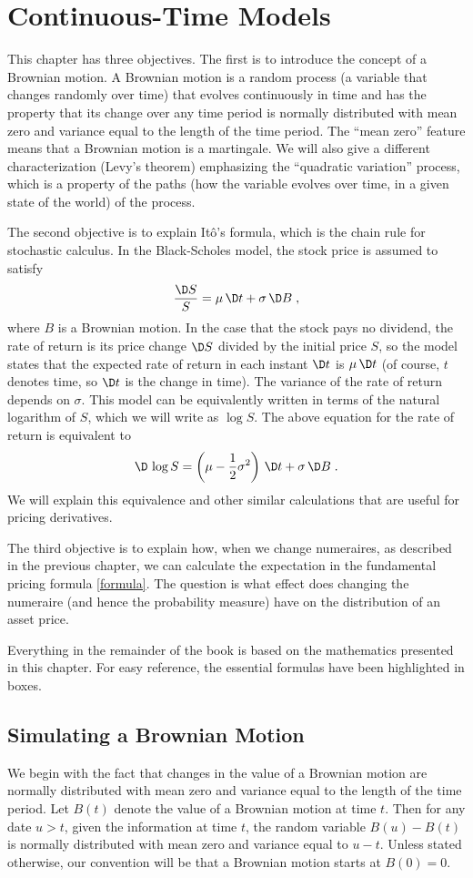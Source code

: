 \chapter{Continuous-Time Models}\label{c_continuoustime}

This chapter has three objectives.  The first is to introduce the concept of a Brownian motion.  A Brownian motion is a random process (a variable that changes randomly over time) that evolves continuously in time and has the property that its change over any time period is normally distributed with mean zero and variance equal to the length of the time period.  The ``mean zero'' feature means that a Brownian motion is a martingale.  We will also give a different characterization (Levy's theorem) emphasizing the ``quadratic variation'' process, which is a property of the paths (how the variable evolves over time, in a given state of the world) of the process.  

The second objective is to explain It\^o's formula, which is the chain rule for stochastic calculus.  In the Black-Scholes model, the stock price is assumed to satisfy
$$\frac{\D S}{S}=\mu\,\D t+\sigma\,\D B\; ,$$
where $B$ is a Brownian motion.  In the case that the stock pays no dividend, the rate of return is its price change $\D S$ divided by the initial price $S$, so the model states that the expected rate of return in each instant $\D t$  is $\mu\,\D t$ (of course, $t$ denotes time, so $\D t$ is the change in time).  The variance of the rate of return depends on $\sigma$.  This model can be equivalently written in terms of the natural logarithm of $S$, which we will write as $\log S$.  The above equation for the rate of return is equivalent to
$$\D\,\log S = \left(\mu - \frac{1}{2}\sigma^2\right)\,\D t + \sigma\,\D B\; .$$
We will explain this equivalence and other similar calculations that are useful for pricing derivatives.

The third objective is to explain how, when we change numeraires, as described in the previous chapter, we can calculate the expectation in the fundamental pricing formula \eqref{formula}.  The question is what effect does changing the numeraire (and hence the probability measure) have on the distribution of an asset price.  

Everything in the remainder of the book is based on the mathematics presented in this chapter.  For easy reference, the essential formulas have been highlighted in boxes.  


\section{Simulating a Brownian Motion}\label{s_simulatingbrownian}
We begin with the fact that changes in the value of a Brownian motion  are normally distributed with mean zero and variance equal to the length of the time period.  Let $B(t)$ denote the value of a Brownian motion at time $t$.  Then for any date $u>t$, given the information at time $t$, the random variable $B(u) - B(t)$ is normally distributed with mean zero and variance equal to $u-t$.  Unless stated otherwise, our convention will be that a Brownian motion starts at $B(0)=0$.


